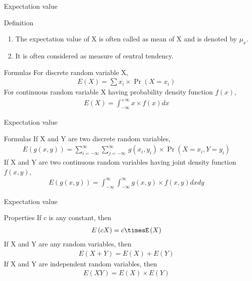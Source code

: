 \documentclass{beamer}
\providecommand{\brak}[1]{\ensuremath{\left(#1\right)}}
\begin{document}
\begin{frame}{Expectation value}
    \begin{block}{Definition}
        \begin{enumerate}
            \item The expectation value of X is often called as mean of X and is denoted by $\mu_x$.
            \item It is often considered as measure of central tendency.
        \end{enumerate}
    \end{block}
    \begin{block}{Formulas}
        For discrete random variable X,
        \begin{align}
            E\brak{X}=\sum x_{i}\times\Pr\brak{X=x_{i}}
        \end{align}
        For continuous random variable X having probability density function $f(x)$,
        \begin{align}
            E\brak{X}=\int_{-\infty}^{+\infty} x\times f(x)dx
        \end{align}
    \end{block}
\end{frame}
\begin{frame}{Expectation value}
    \begin{block}{Formulas}
        If X and Y are two discrete random variables,
        \begin{align}
            E\brak{g(x,y)}=\sum^{\infty}_{i=-\infty}\sum^{\infty}_{j=-\infty}\,g(x_i,y_i)\times \Pr\brak{X=x_i,Y=y_i}
        \end{align}
        If X and Y are two continuous random variables having joint density function $f(x,y)$,
        \begin{align}
            E\brak{g(x,y)}=\int_{-\infty}^{\infty}\int_{-\infty}^{\infty} g(x,y) \times f(x,y)dxdy
        \end{align}
    \end{block}
\end{frame}
\begin{frame}{Expectation value}
    \begin{block}{Properties}
        If c is any constant, then
        \begin{align}
            E\brak{cX}=c\timesE\brak{X}
        \end{align}
        If X and Y are any random variables, then
        \begin{align}
            E\brak{X + Y} = E\brak{X} + E\brak{Y}
        \end{align}
        If X and Y are independent random variables, then
        \begin{align}
            E\brak{XY} = E\brak{X} \times E\brak{Y}
        \end{align}
    \end{block}
\end{frame}
\end{document}

